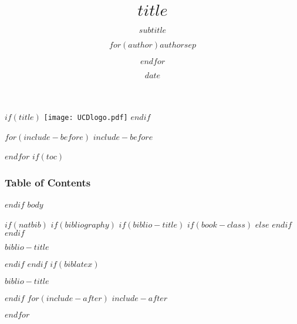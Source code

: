 \documentclass[$if(fontsize)$$fontsize$,$endif$$if(lang)$$babel-lang$,$endif$$if(handout)$handout,$endif$$if(beamer)$ignorenonframetext,$endif$$for(classoption)$$classoption$$sep$,$endfor$]{$documentclass$}
\title{$title$}
\subtitle{$subtitle$}
\author{$for(author)$$author$$sep$ \and $endfor$}
\date{$date$}
\newif\ifbibliography
\begin{document}
	$if(title)$
	\frame[plain]{\titlepage}
		\texttt{[image: UCDlogo.pdf]}
	$endif$
	
	$for(include-before)$
	$include-before$
	
	$endfor$
	$if(toc)$
	\begin{frame}
		\frametitle{Table of Contents}
		\tableofcontents[hideallsubsections]
	\end{frame}
	
	$endif$
	$body$
	
	$if(natbib)$
	$if(bibliography)$
	$if(biblio-title)$
	$if(book-class)$
	\renewcommand\bibname{$biblio-title$}
	$else$
	\renewcommand\refname{$biblio-title$}
	$endif$
	$endif$
	\begin{frame}[allowframebreaks]{$biblio-title$}
		\bibliographytrue
		
	\end{frame}
	
	$endif$
	$endif$
	$if(biblatex)$
	\begin{frame}[allowframebreaks]{$biblio-title$}
		\bibliographytrue
		\printbibliography[heading=none]
	\end{frame}
	
	$endif$
	$for(include-after)$
	$include-after$
	
	$endfor$
\end{document}
